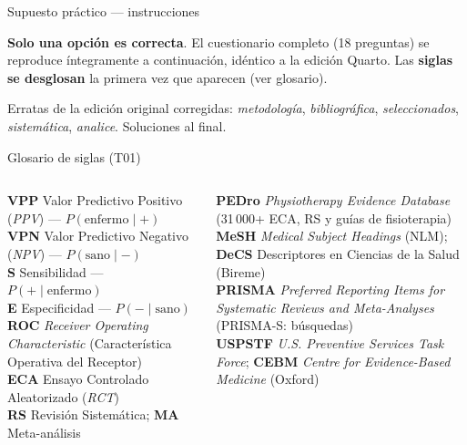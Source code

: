 \documentclass[aspectratio=169,8pt]{beamer}
\begin{document}
\begin{frame}{Supuesto pr\'actico --- instrucciones}
  \small
  \begin{tcolorbox}[amberbox]
    \textbf{Solo una opci\'on es correcta}. El cuestionario completo (18 preguntas) se reproduce \'integramente a continuaci\'on, id\'entico a la edici\'on Quarto. Las \textbf{siglas se desglosan} la primera vez que aparecen (ver glosario).
  \end{tcolorbox}
  \vspace{0.3em}
  {\scriptsize\color{neutral}Erratas de la edici\'on original corregidas: \emph{metodolog\'ia}, \emph{bibliogr\'afica}, \emph{seleccionados}, \emph{sistem\'atica}, \emph{analice}. Soluciones al final.}
\end{frame}

\begin{frame}{Glosario de siglas (T01)}
  \scriptsize
  \begin{columns}[T,onlytextwidth]
      \begin{tcolorbox}[infobox,title=Siglas cl\'inicas y metodol\'ogicas]
        \scriptsize
        \textbf{VPP} Valor Predictivo Positivo (\emph{PPV}) --- $P(\text{enfermo}\mid+)$\\
        \textbf{VPN} Valor Predictivo Negativo (\emph{NPV}) --- $P(\text{sano}\mid-)$\\
        \textbf{S} Sensibilidad --- $P(+\mid\text{enfermo})$\\
        \textbf{E} Especificidad --- $P(-\mid\text{sano})$\\
        \textbf{ROC} \emph{Receiver Operating Characteristic} (Caracter\'istica Operativa del Receptor)\\
        \textbf{ECA} Ensayo Controlado Aleatorizado (\emph{RCT})\\
        \textbf{RS} Revisi\'on Sistem\'atica; \textbf{MA} Meta-an\'alisis
      \end{tcolorbox}
      \begin{tcolorbox}[tealbox]
        \scriptsize
        \textbf{PEDro} \emph{Physiotherapy Evidence Database} (31\,000+ ECA, RS y gu\'ias de fisioterapia)\\
        \textbf{MeSH} \emph{Medical Subject Headings} (NLM); \textbf{DeCS} Descriptores en Ciencias de la Salud (Bireme)\\
        \textbf{PRISMA} \emph{Preferred Reporting Items for Systematic Reviews and Meta-Analyses} (PRISMA-S: b\'usquedas)\\
        \textbf{USPSTF} \emph{U.S. Preventive Services Task Force}; \textbf{CEBM} \emph{Centre for Evidence-Based Medicine} (Oxford)
      \end{tcolorbox}
  \end{columns}
\end{frame}
\end{document}
